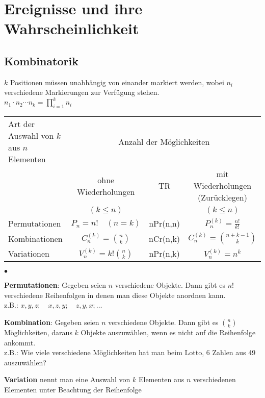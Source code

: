 \section{Ereignisse und ihre Wahrscheinlichkeit}

\subsection{Kombinatorik }
$k$ Positionen müssen unabhängig von einander markiert werden, wobei $n_i$ verschiedene Markierungen zur Verfügung stehen.\\
$n_1 \cdot n_2 \cdots n_k =  \prod_{i=1}^{k} n_i$\\
\begin{tabular}{| p{6cm} | c | c || c |}
  \hline
  Art der Auswahl von $k$ aus $n$ Elementen &
  \multicolumn{3}{c|}{Anzahl der Möglichkeiten} \\
  \cline{2-4}
  & ohne Wiederholungen & TR & mit Wiederholungen (Zurücklegen) \\
 	&	$(k\leq n)$   &      & $(k\leq n)$ \\
 	\hline
 	Permutationen & $P_n=n!\quad(n=k)$       & nPr(n,n) & $P_n^{(k)}=\frac{n!}{k!}$ \\
 	Kombinationen & $C_n^{(k)}=\binom n k$   & nCr(n,k) & $C_n^{(k)}=\binom{n+k-1} k$ \\
  Variationen   & $V_n^{(k)}=k!\binom n k$ & nPr(n,k) & $V_n^{(k)}=n^k$ \\
  \hline
\end{tabular}
\begin{list}{$\bullet$}{\setlength{\itemsep}{0cm} \setlength{\parsep}{0cm}
\setlength{\topsep}{0.1cm}}
  \item \textbf{Permutationen}: Gegeben seien $n$ verschiedene Objekte. Dann
    gibt es $n!$ verschiedene Reihenfolgen in denen man diese Objekte anordnen
    kann. \\
    z.B.: $x,y,z;\quad x,z,y;\quad z,y,x;\ldots$
  \item \textbf{Kombination}: Gegeben seien $n$ verschiedene Objekte. Dann gibt
    es $\binom n k$ Möglichkeiten, daraus $k$ Objekte auszuwählen, wenn es nicht
    auf die Reihenfolge ankommt. \\
    z.B.: Wie viele verschiedene Möglichkeiten hat man beim Lotto, 6 Zahlen aus
    49 auszuwählen?
  \item \textbf{Variation} nennt man eine Auswahl von $k$ Elementen aus $n$
    verschiedenen Elementen unter Beachtung der Reihenfolge
\end{list}
